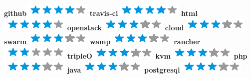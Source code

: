 \documentclass[]{friggeri-cv}
\begin{document}
\begin{aside}
        \textbf{github}\includegraphics[scale=0.40]{img/4stars.png}
        \textbf{travis-ci}\includegraphics[scale=0.40]{img/4stars.png}
        \textbf{html}\includegraphics[scale=0.40]{img/4stars.png}
        \textbf{openstack}\includegraphics[scale=0.40]{img/3stars.png}
        \textbf{cloud}\includegraphics[scale=0.40]{img/3stars.png}
        \textbf{swarm}\includegraphics[scale=0.40]{img/3stars.png}
        \textbf{wamp}\includegraphics[scale=0.40]{img/3stars.png}
        \textbf{rancher}\includegraphics[scale=0.40]{img/2stars.png}
        \textbf{tripleO}\includegraphics[scale=0.40]{img/3stars.png}
        \textbf{kvm}\includegraphics[scale=0.40]{img/3stars.png}
        \textbf{php}\includegraphics[scale=0.40]{img/3stars.png}
        \textbf{java}\includegraphics[scale=0.40]{img/3stars.png}
        \textbf{postgresql}\includegraphics[scale=0.40]{img/3stars.png}

\end{aside}
\end{document}
